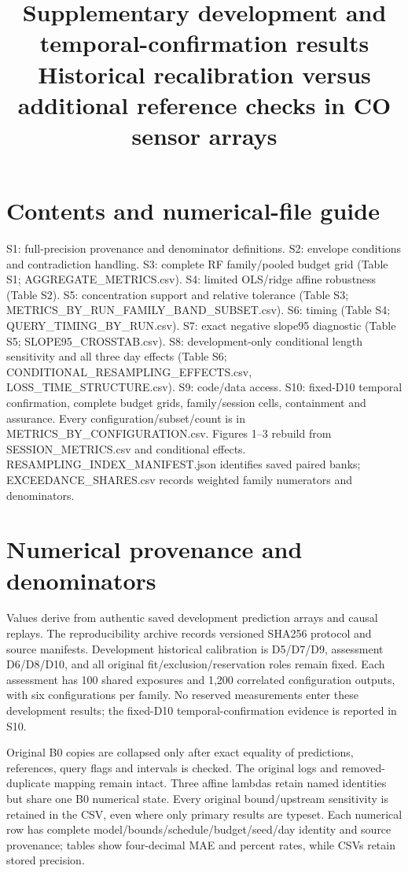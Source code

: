 \documentclass[11pt,a4paper]{article}
\title{Supplementary development and temporal-confirmation results\\\large Historical recalibration versus additional reference checks in CO sensor arrays}
\date{}
\begin{document}
\nocite{miquel2022,baur2020,uci487,gaebel2026,gruber2023,walter1990,calliess2017,malherbe2017,vergara2012,spinelle2015,spinelle2017,se2024,ljung1983,angelopoulos2021,burgues2018linear,burgues2018opls,jcgm100,jcgm200}
\maketitle
\section*{Contents and numerical-file guide}
\begingroup\raggedright
S1: full-precision provenance and denominator definitions. S2: envelope conditions and contradiction handling. S3: complete RF family/pooled budget grid (Table S1; AGGREGATE\_METRICS.csv). S4: limited OLS/ridge affine robustness (Table S2). S5: concentration support and relative tolerance (Table S3; METRICS\_BY\_RUN\_FAMILY\_BAND\_SUBSET.csv). S6: timing (Table S4; QUERY\_TIMING\_BY\_RUN.csv). S7: exact negative slope95 diagnostic (Table S5; SLOPE95\_CROSSTAB.csv). S8: development-only conditional length sensitivity and all three day effects (Table S6; CONDITIONAL\_RESAMPLING\_EFFECTS.csv, LOSS\_TIME\_STRUCTURE.csv). S9: code/data access. S10: fixed-D10 temporal confirmation, complete budget grids, family/session cells, containment and assurance. Every configuration/subset/count is in METRICS\_BY\_CONFIGURATION.csv. Figures 1--3 rebuild from SESSION\_METRICS.csv and conditional effects. RESAMPLING\_INDEX\_MANIFEST.json identifies saved paired banks; EXCEEDANCE\_SHARES.csv records weighted family numerators and denominators.\par\endgroup
\section{Numerical provenance and denominators}
Values derive from authentic saved development prediction arrays and causal replays. The reproducibility archive records versioned SHA256 protocol and source manifests. Development historical calibration is D5/D7/D9, assessment D6/D8/D10, and all original fit/exclusion/reservation roles remain fixed. Each assessment has 100 shared exposures and 1,200 correlated configuration outputs, with six configurations per family. No reserved measurements enter these development results; the fixed-D10 temporal-confirmation evidence is reported in S10.

Original B0 copies are collapsed only after exact equality of predictions, references, query flags and intervals is checked. The original logs and removed-duplicate mapping remain intact. Three affine lambdas retain named identities but share one B0 numerical state. Every original bound/upstream sensitivity is retained in the CSV, even where only primary results are typeset. Each numerical row has complete model/bounds/schedule/budget/seed/day identity and source provenance; tables show four-decimal MAE and percent rates, while CSVs retain stored precision.
\end{document}
